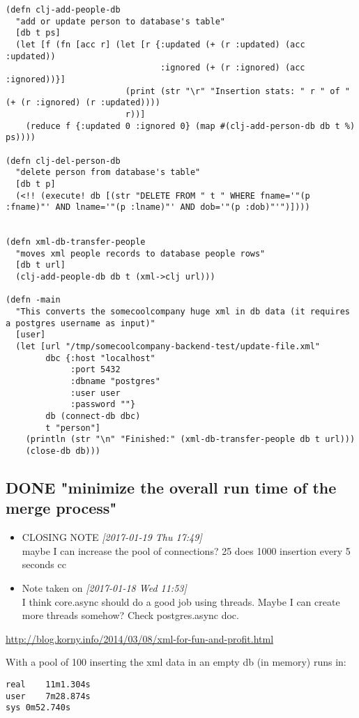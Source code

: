 \documentclass[11pt]{article}
\begin{document}
\begin{verbatim}
(defn clj-add-people-db
  "add or update person to database's table"
  [db t ps]
  (let [f (fn [acc r] (let [r {:updated (+ (r :updated) (acc :updated))
                               :ignored (+ (r :ignored) (acc :ignored))}]
                        (print (str "\r" "Insertion stats: " r " of " (+ (r :ignored) (r :updated))))
                        r))]
    (reduce f {:updated 0 :ignored 0} (map #(clj-add-person-db db t %) ps))))

(defn clj-del-person-db
  "delete person from database's table"
  [db t p]
  (<!! (execute! db [(str "DELETE FROM " t " WHERE fname='"(p :fname)"' AND lname='"(p :lname)"' AND dob='"(p :dob)"'")])))


(defn xml-db-transfer-people
  "moves xml people records to database people rows"
  [db t url]
  (clj-add-people-db db t (xml->clj url)))

(defn -main
  "This converts the somecoolcompany huge xml in db data (it requires a postgres username as input)"
  [user]
  (let [url "/tmp/somecoolcompany-backend-test/update-file.xml"
        dbc {:host "localhost" 
             :port 5432 
             :dbname "postgres" 
             :user user 
             :password ""}
        db (connect-db dbc)
        t "person"]
    (println (str "\n" "Finished:" (xml-db-transfer-people db t url)))
    (close-db db)))
\end{verbatim}

\subsection{{\bfseries\sffamily DONE} "minimize the overall run time of the merge process"}
\label{sec:org2ed5e42}
\begin{itemize}
\item CLOSING NOTE \textit{[2017-01-19 Thu 17:49] } \\
maybe I can increase the pool of connections? 25 does 1000
insertion every 5 seconds cc
\item Note taken on \textit{[2017-01-18 Wed 11:53] } \\
I think core.async should do a good job using threads. Maybe I can create more threads somehow? Check postgres.async doc.
\end{itemize}

\url{http://blog.korny.info/2014/03/08/xml-for-fun-and-profit.html}

With a pool of 100 inserting the xml data in an empty db (in memory) runs in:
\begin{verbatim}
real	11m1.304s
user	7m28.874s
sys	0m52.740s
\end{verbatim}
\end{document}
